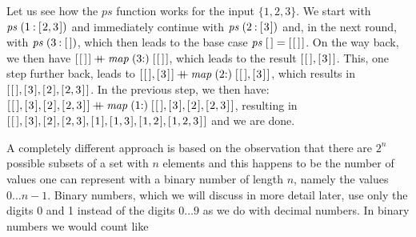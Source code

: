 \documentclass{scrreprt}
\newcommand{\Varid}[1]{\mathit{#1}}
\newcommand{\plus}{\mathbin{+\!\!\!+}}
\begin{document}
Let us see
how the $ps$ function works for the 
input $\lbrace 1,2,3\rbrace$.
We start with \ensuremath{\Varid{ps}\;(\mathrm{1}\mathbin{:}[\mskip1.5mu \mathrm{2},\mathrm{3}\mskip1.5mu])}
and immediately continue with \ensuremath{\Varid{ps}\;(\mathrm{2}\mathbin{:}[\mskip1.5mu \mathrm{3}\mskip1.5mu])}
and, in the next round, with \ensuremath{\Varid{ps}\;(\mathrm{3}\mathbin{:}[\mskip1.5mu \mskip1.5mu])},
which then leads to the base case 
\ensuremath{\Varid{ps}\;[\mskip1.5mu \mskip1.5mu]\mathrel{=}[\mskip1.5mu [\mskip1.5mu \mskip1.5mu]\mskip1.5mu]}.
On the way back,
we then have \ensuremath{[\mskip1.5mu [\mskip1.5mu \mskip1.5mu]\mskip1.5mu]\plus \Varid{map}\;(\mathrm{3}\mathbin{:})\;[\mskip1.5mu [\mskip1.5mu \mskip1.5mu]\mskip1.5mu]},
which leads to the result \ensuremath{[\mskip1.5mu [\mskip1.5mu \mskip1.5mu],[\mskip1.5mu \mathrm{3}\mskip1.5mu]\mskip1.5mu]}.
This, one step further back,
leads to 
\ensuremath{[\mskip1.5mu [\mskip1.5mu \mskip1.5mu],[\mskip1.5mu \mathrm{3}\mskip1.5mu]\mskip1.5mu]\plus \Varid{map}\;(\mathrm{2}\mathbin{:})\;[\mskip1.5mu [\mskip1.5mu \mskip1.5mu],[\mskip1.5mu \mathrm{3}\mskip1.5mu]\mskip1.5mu]},
which results in
\ensuremath{[\mskip1.5mu [\mskip1.5mu \mskip1.5mu],[\mskip1.5mu \mathrm{3}\mskip1.5mu],[\mskip1.5mu \mathrm{2}\mskip1.5mu],[\mskip1.5mu \mathrm{2},\mathrm{3}\mskip1.5mu]\mskip1.5mu]}.
In the previous step, we then have:
\ensuremath{[\mskip1.5mu [\mskip1.5mu \mskip1.5mu],[\mskip1.5mu \mathrm{3}\mskip1.5mu],[\mskip1.5mu \mathrm{2}\mskip1.5mu],[\mskip1.5mu \mathrm{2},\mathrm{3}\mskip1.5mu]\mskip1.5mu]\plus \Varid{map}\;(\mathrm{1}\mathbin{:})\;[\mskip1.5mu [\mskip1.5mu \mskip1.5mu],[\mskip1.5mu \mathrm{3}\mskip1.5mu],[\mskip1.5mu \mathrm{2}\mskip1.5mu],[\mskip1.5mu \mathrm{2},\mathrm{3}\mskip1.5mu]\mskip1.5mu]},
resulting in\\
\ensuremath{[\mskip1.5mu [\mskip1.5mu \mskip1.5mu],[\mskip1.5mu \mathrm{3}\mskip1.5mu],[\mskip1.5mu \mathrm{2}\mskip1.5mu],[\mskip1.5mu \mathrm{2},\mathrm{3}\mskip1.5mu],[\mskip1.5mu \mathrm{1}\mskip1.5mu],[\mskip1.5mu \mathrm{1},\mathrm{3}\mskip1.5mu],[\mskip1.5mu \mathrm{1},\mathrm{2}\mskip1.5mu],[\mskip1.5mu \mathrm{1},\mathrm{2},\mathrm{3}\mskip1.5mu]\mskip1.5mu]}
and we are done.

A completely different approach
is based on the observation
that there are $2^n$ possible subsets
of a set with $n$ elements
and this happens to be the number
of values one can represent
with a binary number of length $n$,
namely the values $0 \dots n - 1$.
Binary numbers, which we will discuss in more detail later,
use only the digits 0 and 1
instead of the digits $0\dots 9$
as we do with decimal numbers.
In binary numbers we would count like
\end{document}

